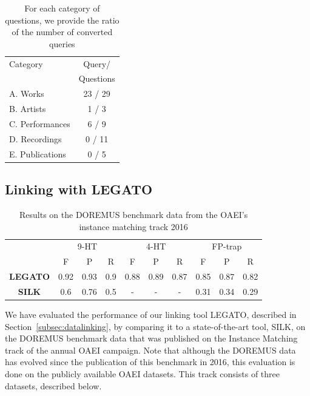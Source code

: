 \documentclass{article}
\begin{document}
\begin{table}
 \begin{center}
 \begin{tabular}{|l|c|}
  \hline
  Category & Query/ \\
    & Questions \\
  \hline
  A. Works & 23 / 29 \\
  \hline
  B. Artists & 1 / 3 \\
  \hline
  C. Performances & 6 / 9 \\
  \hline
  D. Recordings & 0 / 11 \\
  \hline
  E. Publications & 0 / 5 \\
  \hline
 \end{tabular}
\end{center}
 \caption{For each category of questions, we provide the ratio of the number of converted queries}
 \label{tab:queries}
\end{table}


\subsection{Linking with LEGATO} \label{sec:eval-link}
\begin{table}[t]
\begin{center}
	\begin{tabular}{|c|c|c|c|c|c|c|c|c|c|}
		\hline
		{}{}{} & \multicolumn{3}{c|}{9-HT} & %
		\multicolumn{3}{c|}{4-HT} &  \multicolumn{3}{c|}{FP-trap}\\
		\cline{2-10}
		& F & P & R & F & P & R & F & P & R \\
		\hline
		\textbf{\textbf{LEGATO}} & 0.92 & 0.93 & 0.9 & 0.88 & 0.89 & 0.87 & 0.85 & 0.87 & 0.82 \\
		\hline
		\textbf{SILK} & 0.6 & 0.76 & 0.5 & - & - & - & 0.31 & 0.34 & 0.29\\
		\hline
	\end{tabular}
	\caption{Results on the DOREMUS benchmark data from the OAEI's instance matching track 2016}
	\label{table:doremus}
\end{center}
\end{table}

We have evaluated the performance of our linking tool LEGATO, described in Section~\ref{subsec:datalinking}, by comparing it to a state-of-the-art tool, SILK, on the DOREMUS benchmark data that was published on the Instance Matching track of the annual OAEI campaign. Note that although the DOREMUS data has evolved since the publication of this benchmark in 2016, this evaluation is done on the publicly available OAEI datasets. This track consists of three datasets, described below. 
\end{document}
